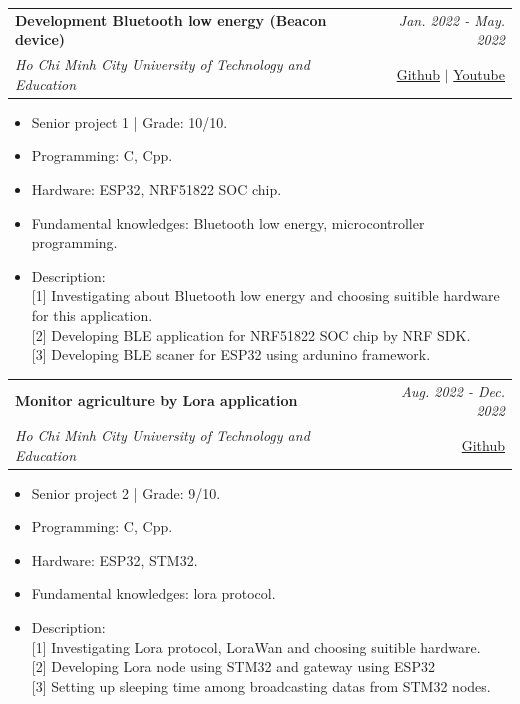 \documentclass[a4paper,11pt]{article}
\makeatletter
\newcommand{\resumeProject}[4]{
\vspace{0.5mm}\item
    \begin{tabular*}{0.98\textwidth}[t]{l@{\extracolsep{\fill}}r}
        \textbf{#1} & \textit{\footnotesize{#3}} \\
        \footnotesize{\textit{#2}} & \footnotesize{#4}
    \end{tabular*}
    \vspace{-2.4mm}
}
\newcommand{\resumeItemListStart}{\begin{justify}\begin{itemize}[leftmargin=3ex, rightmargin=2ex, noitemsep,labelsep=1.2mm,itemsep=0mm]\small}
\newcommand{\resumeItemListEnd}{\end{itemize}\end{justify}\vspace{-2mm}}
\makeatother
\begin{document}
    \resumeProject
      {Development Bluetooth low energy (Beacon device)} %
      {Ho Chi Minh City University of Technology and Education} %
      {Jan. 2022 - May. 2022}
      {\href{https://github.com/Winxkin/beaconapplication}{Github} $|$ \href{https://www.youtube.com/watch?v=Auvf9YhzOnM}{Youtube}}
      \resumeItemListStart
        \item {Senior project 1 | Grade: 10/10.}
        \item {Programming: C, Cpp.}
        \item {Hardware: ESP32, NRF51822 SOC chip.}
        \item {Fundamental knowledges: Bluetooth low energy, microcontroller programming.}
        \item {Description:}\hfill
        \\ {[1] Investigating about Bluetooth low energy and choosing suitible hardware for this application.}
        \\ {[2] Developing BLE application for NRF51822 SOC chip by NRF SDK.}
        \\ {[3] Developing BLE scaner for ESP32 using ardunino framework.}
    \resumeItemListEnd

    \resumeProject
      {Monitor agriculture by Lora application}%
      {Ho Chi Minh City University of Technology and Education}%
      {Aug. 2022 - Dec. 2022}
      {\href{https://github.com/Winxkin/monitor_agriculture}{Github}}
      \resumeItemListStart
        \item {Senior project 2 | Grade: 9/10.}
        \item {Programming: C, Cpp.}
        \item {Hardware: ESP32, STM32.}
        \item {Fundamental knowledges: lora protocol.}
        \item {Description:}\hfill
        \\ {[1] Investigating Lora protocol, LoraWan and choosing suitible hardware.}
        \\ {[2] Developing Lora node using STM32 and gateway using ESP32}
        \\ {[3] Setting up sleeping time among broadcasting datas from STM32 nodes.}
    \resumeItemListEnd
\end{document}
